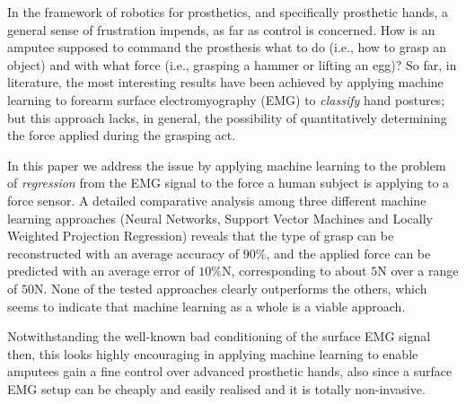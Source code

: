 In the framework of robotics for prosthetics, and specifically
prosthetic hands, a general sense of frustration impends, as far as
control is concerned. How is an amputee supposed to command the
prosthesis what to do (i.e., how to grasp an object) and with what
force (i.e., grasping a hammer or lifting an egg)? So far, in
literature, the most interesting results have been achieved by
applying machine learning to forearm surface electromyography (EMG) to
\emph{classify} hand postures; but this approach lacks, in general,
the possibility of quantitatively determining the force applied during
the grasping act.

In this paper we address the issue by applying machine learning to the
problem of \emph{regression} from the EMG signal to the force a human
subject is applying to a force sensor. A detailed comparative analysis
among three different machine learning approaches (Neural Networks,
Support Vector Machines and Locally Weighted Projection Regression)
reveals that the type of grasp can be reconstructed with an average
accuracy of $90\%$, and the applied force can be predicted with an
average error of $10\%$N, corresponding to about $5$N over a range of
$50$N. None of the tested approaches clearly outperforms the others,
which seems to indicate that machine learning as a whole is a viable
approach.

Notwithstanding the well-known bad conditioning of the surface EMG
signal then, this looks highly encouraging in applying machine
learning to enable amputees gain a fine control over advanced
prosthetic hands, also since a surface EMG setup can be cheaply and
easily realised and it is totally non-invasive.
